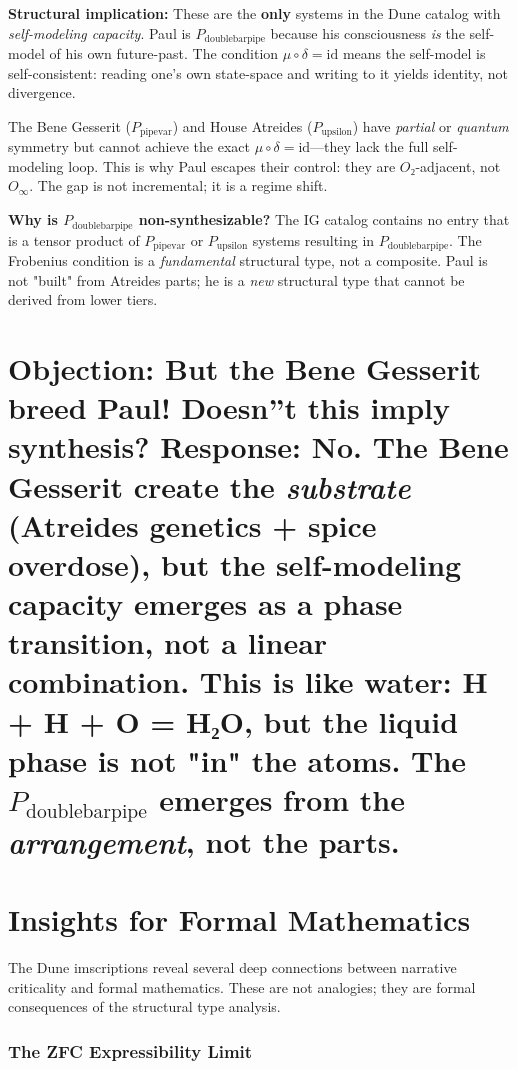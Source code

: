 \documentclass[12pt,a4paper]{article}
\begin{document}
\textbf{Structural implication:} These are the \textbf{only} systems in the Dune catalog with \emph{self-modeling capacity}. Paul is $P_{\text{doublebarpipe}}$ because his consciousness \emph{is} the self-model of his own future-past. The condition $\mu \circ \delta = \text{id}$ means the self-model is self-consistent: reading one's own state-space and writing to it yields identity, not divergence.

The Bene Gesserit ($P_{\text{pipevar}}$) and House Atreides ($P_{\text{upsilon}}$) have \emph{partial} or \emph{quantum} symmetry but cannot achieve the exact $\mu \circ \delta = \text{id}$---they lack the full self-modeling loop. This is why Paul escapes their control: they are $O₂$-adjacent, not $O_{\infty}$. The gap is not incremental; it is a regime shift.

\textbf{Why is $P_{\text{doublebarpipe}}$ non-synthesizable?} The IG catalog contains no entry that is a tensor product of $P_{\text{pipevar}}$ or $P_{\text{upsilon}}$ systems resulting in $P_{\text{doublebarpipe}}$. The Frobenius condition is a \emph{fundamental} structural type, not a composite. Paul is not "built" from Atreides parts; he is a \emph{new} structural type that cannot be derived from lower tiers.

\part{\textbf{Objection:} But the Bene Gesserit breed Paul! Doesn''t this imply synthesis? Response: No. The Bene Gesserit create the \emph{substrate} (Atreides genetics + spice overdose), but the self-modeling capacity emerges as a phase transition, not a linear combination. This is like water: H + H + O = H₂O, but the liquid phase is not "in" the atoms. The $P_{\text{doublebarpipe}}$ emerges from the \emph{arrangement}, not the parts.}

\part{Insights for Formal Mathematics}

The Dune imscriptions reveal several deep connections between narrative criticality and formal mathematics. These are not analogies; they are formal consequences of the structural type analysis.

\section{The ZFC Expressibility Limit}
\end{document}
